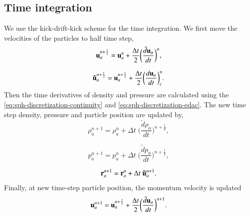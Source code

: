 \subsection{Time integration}

We use the kick-drift-kick scheme for the time integration. We first move the
velocities of the particles to half time step,
\begin{equation}
  \label{eq:velocity-update-stage-1}
  \mathbf{u}_a^{n+\frac{1}{2}} = \mathbf{u}_a^{n} + \frac{\Delta t}{2} \bigg(\frac{\tilde{d}\mathbf{u}_{a}}{dt}\bigg)^n,
\end{equation}

\begin{equation}
  \label{eq:velocity-hat-update-stage-1}
  \mathbf{\tilde{u}}_a^{n+\frac{1}{2}} = \mathbf{u}_a^{n+\frac{1}{2}} + \frac{\Delta t}{2} \bigg(\frac{d\mathbf{u}_{a}}{dt}\bigg)^{n}_{c}.
\end{equation}
%
Then the time derivatives of density and pressure are calculated using the
\cref{eq:sph-discretization-continuity} and \cref{eq:sph-discretization-edac}.
The new time step density, pressure and particle position are updated by,
\begin{equation}
  \label{eq:density-update-stage-2}
  \rho_{a}^{n+1} = \rho_{a}^{n} + \Delta t \; \bigg(\frac{\tilde{d}\rho_{a}}{dt}\bigg)^{n+\frac{1}{2}},
\end{equation}

\begin{equation}
  \label{eq:pressure-update-stage-2}
  p_{a}^{n+1} = p_{a}^{n} + \Delta t \; \bigg(\frac{\tilde{d}p_{a}}{dt}\bigg)^{n+\frac{1}{2}},
\end{equation}

\begin{equation}
  \label{eq:position-update-stage-2}
  \mathbf{r}_{a}^{n+1} = \mathbf{r}_{a}^{n} + \Delta t \; \mathbf{\tilde{u}}_{a}^{n+1}.
\end{equation}
%
Finally, at new time-step particle position, the momentum velocity is updated
\begin{equation}
  \label{eq:velocity-update-stage-3}
  \mathbf{u}_a^{n+1} = \mathbf{u}_a^{n+\frac{1}{2}} + \frac{\Delta t}{2} \bigg(\frac{\tilde{d}\mathbf{u}_{a}}{dt}\bigg)^{n+1}.
\end{equation}


